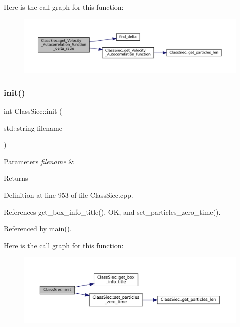 Here is the call graph for this function\+:
\nopagebreak
\begin{figure}[H]
\begin{center}
\leavevmode
\includegraphics[width=350pt]{classClassSiec_af6d6dbab3224e645c67e6c7dd2e02378_cgraph}
\end{center}
\end{figure}
\mbox{\label{classClassSiec_a5c2c133544d66df25e8b13e6b710272e}} 
\subsubsection{\texorpdfstring{init()}{init()}}
{\footnotesize\ttfamily int Class\+Siec\+::init (\begin{DoxyParamCaption}\item[{std\+::string}]{filename }\end{DoxyParamCaption})}


\begin{DoxyParams}{Parameters}
{\em filename} & \\
\hline
\end{DoxyParams}
\begin{DoxyReturn}{Returns}

\end{DoxyReturn}


Definition at line 953 of file Class\+Siec.\+cpp.



References get\+\_\+box\+\_\+info\+\_\+title(), OK, and set\+\_\+particles\+\_\+zero\+\_\+time().



Referenced by main().

Here is the call graph for this function\+:
\nopagebreak
\begin{figure}[H]
\begin{center}
\leavevmode
\includegraphics[width=350pt]{classClassSiec_a5c2c133544d66df25e8b13e6b710272e_cgraph}
\end{center}
\end{figure}
\mbox{\label{classClassSiec_ab49b9f6b28f5e3c319384f518042272a}} 
